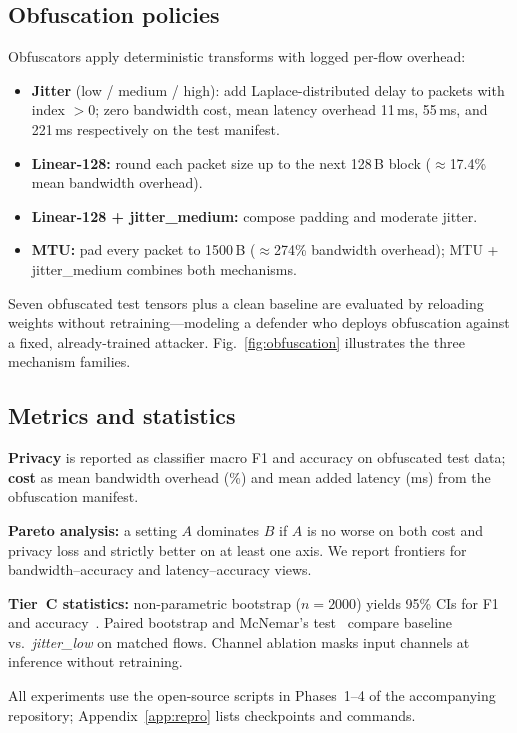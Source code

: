 \subsection{Obfuscation policies}

Obfuscators apply deterministic transforms with logged per-flow overhead:
\begin{itemize}
  \item \textbf{Jitter} (low / medium / high): add Laplace-distributed delay to
        packets with index $>0$; zero bandwidth cost, mean latency overhead 11\,ms,
        55\,ms, and 221\,ms respectively on the test manifest.
  \item \textbf{Linear-128:} round each packet size up to the next 128\,B block
        ($\approx$17.4\% mean bandwidth overhead).
  \item \textbf{Linear-128 + jitter\_medium:} compose padding and moderate jitter.
  \item \textbf{MTU:} pad every packet to 1500\,B ($\approx$274\% bandwidth overhead);
        MTU + jitter\_medium combines both mechanisms.
\end{itemize}
Seven obfuscated test tensors plus a clean baseline are evaluated by reloading weights
without retraining---modeling a defender who deploys obfuscation against a fixed,
already-trained attacker. Fig.~\ref{fig:obfuscation} illustrates the three mechanism
families.



\subsection{Metrics and statistics}

\textbf{Privacy} is reported as classifier macro F1 and accuracy on obfuscated test
data; \textbf{cost} as mean bandwidth overhead (\%) and mean added latency (ms) from
the obfuscation manifest.

\textbf{Pareto analysis:} a setting $A$ dominates $B$ if $A$ is no worse on both cost
and privacy loss and strictly better on at least one axis. We report frontiers for
bandwidth--accuracy and latency--accuracy views.

\textbf{Tier~C statistics:} non-parametric bootstrap ($n=2000$) yields 95\% CIs for
F1 and accuracy~\cite{efron1993}. Paired bootstrap and McNemar's test~\cite{mcnemar1947}
compare baseline vs.\ \emph{jitter\_low} on matched flows. Channel ablation masks
input channels at inference without retraining.

All experiments use the open-source scripts in Phases~1--4 of the accompanying
repository; Appendix~\ref{app:repro} lists checkpoints and commands.

